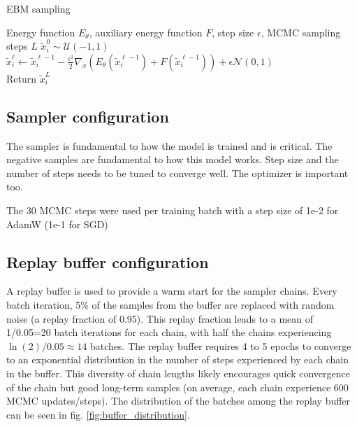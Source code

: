 \begin{algorithm}
\caption{EBM sampling}\label{alg:sampling}
\begin{algorithmic}
\Require Energy function $E_\theta$, auxiliary energy function $F$, step size $\epsilon$, MCMC sampling steps $L$
	\State $\tilde{x}_{i}^0 \sim \mathcal{U}(-1,1)$ 
	  
		\State $\tilde{x}_{i}^\ell \gets \tilde{x}_{i}^{\ell-1} - \frac{\epsilon^2}{2}\nabla_x \left( E_\theta(\tilde{x}_{i}^{\ell-1}) + F(\tilde{x}_{i}^{\ell-1}) \right)+ \epsilon \mathcal{N}(0, 1)$
	\EndFor
	\\
	\State Return $\tilde{x}_{i}^{L}$
	
\end{algorithmic}
\end{algorithm}


\subsection{Sampler configuration}
The sampler is fundamental to how the model is trained and is critical. The negative samples are fundamental to how this model works. Step size and the number of steps needs to be tuned to converge well. The optimizer is important too.

The 30 MCMC steps were used per training batch with a step size of 1e-2 for AdamW (1e-1 for SGD)

\subsection{Replay buffer configuration}
A replay buffer is used to provide a warm start for the sampler chains. Every batch iteration, 5\% of the samples from the buffer are replaced with random noise (a replay fraction of 0.95). This replay fraction leads to a mean of 1/0.05=20 batch iterations for each chain, with half the chains experiencing $\ln(2)/0.05 \approx 14$ batches. The replay buffer requires 4 to 5 epochs to converge to an exponential distribution in the number of steps experienced by each chain in the buffer. This diversity of chain lengths likely encourages quick convergence of the chain but good long-term samples (on average, each chain experience 600 MCMC updates/steps). The distribution of the batches among the replay buffer can be seen in fig. \ref{fig:buffer_distribution}.


